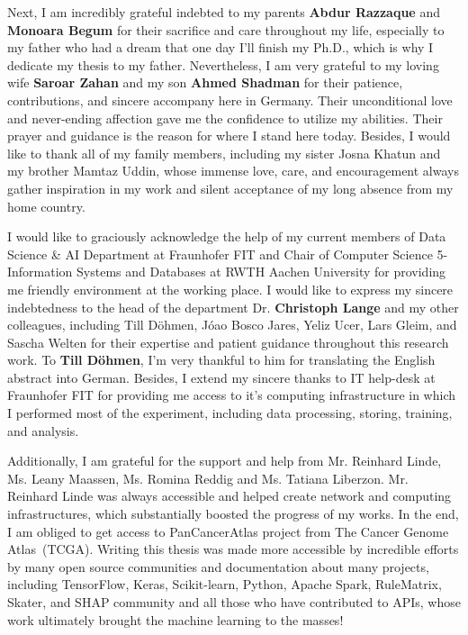\begin{acknowledgements}
    \hspace*{5mm} Next, I am incredibly grateful indebted to my parents \textbf{Abdur Razzaque} and \textbf{Monoara Begum} for their sacrifice and care throughout my life, especially to my father who had a dream that one day I'll finish my Ph.D., which is why I dedicate my thesis to my father. Nevertheless, I am very grateful to my loving wife \textbf{Saroar Zahan} and my son \textbf{Ahmed Shadman} for their patience, contributions, and sincere accompany here in Germany. Their unconditional love and never-ending affection gave me the confidence to utilize my abilities. Their prayer and guidance is the reason for where I stand here today. Besides, I would like to thank all of my family members, including my sister Josna Khatun and my brother Mamtaz Uddin, whose immense love, care, and encouragement always gather inspiration in my work and silent acceptance of my long absence from my home country. 
    
    \hspace*{5mm} I would like to graciously acknowledge the help of my current members of Data Science \& AI Department at Fraunhofer FIT and Chair of Computer Science 5- Information Systems and Databases at RWTH Aachen University for providing me friendly environment at the working place. I would like to express my sincere indebtedness to the head of the department Dr. \textbf{Christoph Lange} and my other colleagues, including Till D{\"o}hmen, J{\'o}ao Bosco Jares, Yeliz Ucer, Lars Gleim, and Sascha Welten for their expertise and patient guidance throughout this research work. To \textbf{Till D{\"o}hmen}, I'm very thankful to him for translating the English abstract into German. Besides, I extend my sincere thanks to IT help-desk at Fraunhofer FIT for providing me access to it's computing infrastructure in which I performed most of the experiment, including data processing, storing, training, and analysis.
    
    \hspace*{5mm} Additionally, I am grateful for the support and help from Mr. Reinhard Linde, Ms. Leany Maassen, Ms. Romina Reddig and Ms. Tatiana Liberzon. Mr. Reinhard Linde was always accessible and helped create network and computing infrastructures, which substantially boosted the progress of my works. In the end, I am obliged to get access to PanCancerAtlas project from The Cancer Genome Atlas~(TCGA). Writing this thesis was made more accessible by incredible efforts by many open source communities and documentation about many projects, including TensorFlow, Keras, Scikit-learn, Python, Apache Spark, RuleMatrix, Skater, and SHAP community and all those who have contributed to APIs, whose work ultimately brought the machine learning to the masses!
    

\end{acknowledgements}
